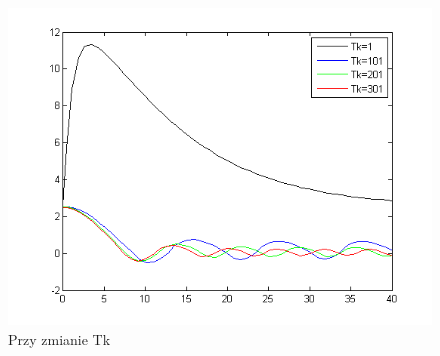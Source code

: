 \documentclass[a4paper,10pt]{article}
\begin{document}
\begin{enumerate}
\begin{figure}[!h]
    \centering
	\includegraphics[width=120mm]{CW3-korekcja-trojpolozeniowyBH-e_Tk.png}
	\caption{Przy zmianie Tk}
    \label{fig:Rysunek}
\end{figure}


\end{enumerate}
\end{document}
